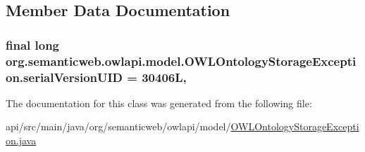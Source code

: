 \subsection{Member Data Documentation}
\hypertarget{classorg_1_1semanticweb_1_1owlapi_1_1model_1_1_o_w_l_ontology_storage_exception_a8fc425bd34432165cddd710737afcc9e}{
\subsubsection[{serial\-Version\-U\-I\-D}]{\setlength{\rightskip}{0pt plus 5cm}final long org.\-semanticweb.\-owlapi.\-model.\-O\-W\-L\-Ontology\-Storage\-Exception.\-serial\-Version\-U\-I\-D = 30406\-L\hspace{0.3cm}{\ttfamily [static]}, {\ttfamily [private]}}}\label{classorg_1_1semanticweb_1_1owlapi_1_1model_1_1_o_w_l_ontology_storage_exception_a8fc425bd34432165cddd710737afcc9e}


The documentation for this class was generated from the following file\-:\begin{DoxyCompactItemize}
\item 
api/src/main/java/org/semanticweb/owlapi/model/\hyperlink{_o_w_l_ontology_storage_exception_8java}{O\-W\-L\-Ontology\-Storage\-Exception.\-java}\end{DoxyCompactItemize}
